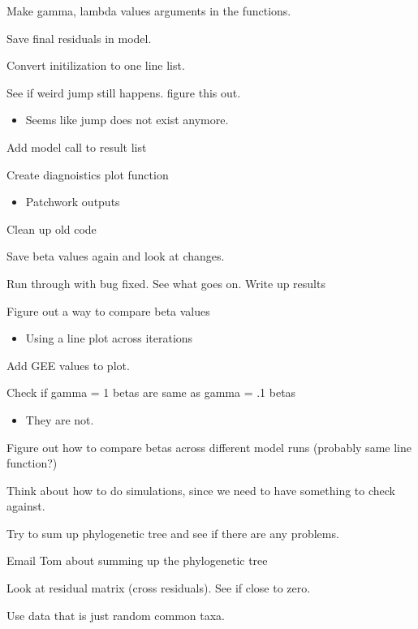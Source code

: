 \documentclass[10pt]{article}
\newcommand{\cmark}{\ding{51}}%
\newcommand{\done}{\rlap{$\square$}{\raisebox{2pt}{\large\hspace{1pt}\cmark}}%
\hspace{-2.5pt}}
\theoremstyle{definition}
\begin{document}
\begin{todolist}
  \item[\done] Make gamma, lambda values arguments in the functions.
  \item[\done] Save final residuals in model.
  \item[\done] Convert initilization to one line list.
  \item[\done] See if weird jump still happens. figure this out.
  \begin{itemize}
    \item Seems like jump does not exist anymore.
  \end{itemize}
  \item[\done] Add model call to result list
  \item[\done] Create diagnoistics plot function
  \begin{itemize}
    \item Patchwork outputs
  \end{itemize}
  \item[\done] Clean up old code
  \item[\done] Save beta values again and look at changes.
  \item[\done] Run through with bug fixed. See what goes on. Write up results
  \item[\done] Figure out a way to compare beta values
  \begin{itemize}
    \item Using a line plot across iterations
  \end{itemize}
  \item[\done] Add GEE values to plot.
  \item[\done] Check if gamma = 1 betas are same as gamma = .1 betas
    \begin{itemize}
      \item They are not.
    \end{itemize}
  \item[\done] Figure out how to compare betas across different model runs (probably same line function?)
  \item Think about how to do simulations, since we need to have something to check against.
  \item Try to sum up phylogenetic tree and see if there are any problems.
  \item Email Tom about summing up the phylogenetic tree
  \item Look at residual matrix (cross residuals). See if close to zero.
  \item Use data that is just random common taxa.

\end{todolist}
\end{document}
